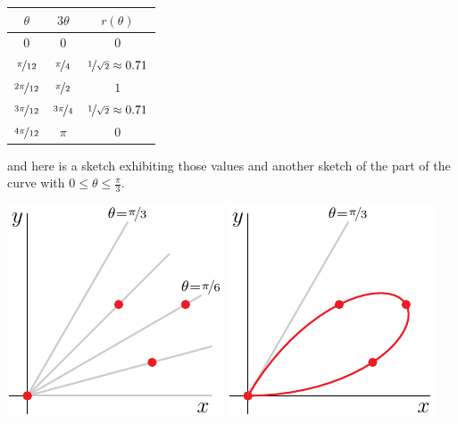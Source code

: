 \begin{eg}
\begin{itemize}
\begin{center}
     \renewcommand{\arraystretch}{1.3}
     \begin{tabular}{ | c | c | c |}
     \hline
     $\theta$ & $3\theta$ & $r(\theta)$ \\
      \hline
      0        &     0     &    0      \\
      \hline
      $\nicefrac{\pi}{12}$  & $\nicefrac{\pi}{4}$  & 
                  $\nicefrac{1}{\sqrt{2}}\approx  0.71$   \\
     \hline
      $\nicefrac{2 \pi}{12}$  & $\nicefrac{\pi}{2}$  &  $1$   \\
      \hline
      $\nicefrac{3 \pi}{12}$  & $\nicefrac{3\pi}{4}$  & 
                  $\nicefrac{1}{\sqrt{2}}\approx  0.71$   \\
     \hline
      $\nicefrac{4 \pi}{12}$  & $\pi$  &  $0$   \\
     \hline
     \end{tabular}
     \renewcommand{\arraystretch}{1.0}
\end{center}
and here is a sketch exhibiting those values and another sketch of the
part of the curve with $0\le \theta\le\frac{\pi}{3}$.
\begin{efig}
\begin{center}
    \includegraphics{rose1.pdf}\qquad\qquad
    \includegraphics{rose1b.pdf}
\end{center}
\end{efig}


\end{itemize}
\end{eg}
